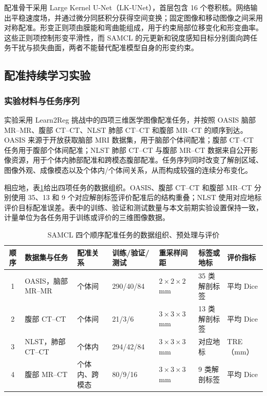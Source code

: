 配准骨干采用 Large Kernel U-Net（LK-UNet），首层包含 16 个卷积核\cite{jia2022lkunet}。网络输出平稳速度场，并通过微分同胚积分获得空间变换；固定图像和移动图像之间采用对称配准。形变正则项由膜能和弯曲能组成，用于约束局部位移变化和形变曲率\cite{ashburner2007diffeomorphic}。这些正则项控制形变平滑性，而 SAMCL 的元更新和锐度感知目标分别面向跨任务干扰与损失曲面，两者不能替代配准模型自身的形变约束。

\subsection{配准持续学习实验}
\label{subsec:samcl-experiments}

\subsubsection{实验材料与任务序列}
\label{subsubsec:samcl-materials}

实验采用 Learn2Reg 挑战中的四项三维医学图像配准任务，并按照 OASIS 脑部 MR--MR、腹部 CT--CT、NLST 肺部 CT--CT 和腹部 MR--CT 的顺序到达\cite{hering2021learn2reg}。OASIS 来源于开放获取脑部 MRI 数据集，用于脑部个体间配准\cite{marcus2007oasis}；腹部 CT--CT 任务用于腹部个体间配准\cite{xu2016abdomenreg}；NLST 肺部 CT--CT 与腹部 MR--CT 数据来自公开影像资源，用于个体内肺部配准和跨模态腹部配准\cite{clark2013tcia,xu2016abdomenreg}。任务序列同时改变了解剖区域、图像外观、成像模态以及个体内/个体间关系，从而构成较强的连续分布变化。

相应地，表\ref{tab:samcl-datasets}给出四项任务的数据组织。OASIS、腹部 CT--CT 和腹部 MR--CT 分别使用 35、13 和 9 个对应解剖标签评价配准后的结构重叠；NLST 使用对应地标评价目标配准误差。表中的训练、验证和测试数量与本文前期实验设置保持一致\cite{wang2024samcl}，计量单位为各任务用于训练或评价的三维图像数据。

\begin{table}[htbp]
\centering
\caption{SAMCL 四个顺序配准任务的数据组织、预处理与评价}
\label{tab:samcl-datasets}
\thesistablefont
\renewcommand{\arraystretch}{1.14}
\setlength{\tabcolsep}{3pt}
\begin{tabularx}{\textwidth}{@{}cXp{1.8cm}p{2.35cm}p{1.65cm}p{2.0cm}p{1.5cm}@{}}
\toprule
顺序 & 数据集与任务 & 配准关系 & 训练/验证/测试 & 重采样间距 & 标签或地标 & 评价指标 \\
\midrule
1 & OASIS，脑部 MR--MR & 个体间 & 290/40/84 & $2\times2\times2$ mm & 35 类解剖标签 & 平均 Dice \\
2 & 腹部 CT--CT & 个体间 & 21/3/6 & $3\times3\times3$ mm & 13 类解剖标签 & 平均 Dice \\
3 & NLST，肺部 CT--CT & 个体内 & 294/42/84 & $3\times3\times3$ mm & 对应地标 & TRE（mm） \\
4 & 腹部 MR--CT & 个体内、跨模态 & 80/9/16 & $3\times3\times3$ mm & 9 类解剖标签 & 平均 Dice \\
\bottomrule
\end{tabularx}
\end{table}

